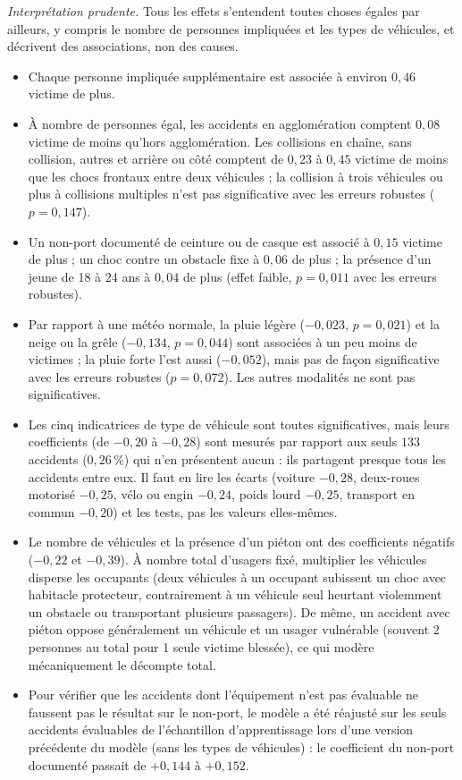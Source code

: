 \documentclass[11pt,a4paper]{article}
\begin{document}
\noindent\textit{Interprétation prudente.} Tous les effets s'entendent \og toutes choses égales par ailleurs\fg{}, y compris le nombre de personnes impliquées et les types de véhicules, et décrivent des associations, non des causes.
\begin{itemize}
    \item Chaque personne impliquée supplémentaire est associée à environ $0{,}46$ victime de plus.
    \item À nombre de personnes égal, les accidents en agglomération comptent $0{,}08$ victime de moins qu'hors agglomération. Les collisions en chaîne, sans collision, autres et arrière ou côté comptent de $0{,}23$ à $0{,}45$ victime de moins que les chocs frontaux entre deux véhicules ; la collision à trois véhicules ou plus à collisions multiples n'est pas significative avec les erreurs robustes ($p = 0{,}147$).
    \item Un non-port documenté de ceinture ou de casque est associé à $0{,}15$ victime de plus ; un choc contre un obstacle fixe à $0{,}06$ de plus ; la présence d'un jeune de 18 à 24 ans à $0{,}04$ de plus (effet faible, $p = 0{,}011$ avec les erreurs robustes).
    \item Par rapport à une météo normale, la pluie légère ($-0{,}023$, $p = 0{,}021$) et la neige ou la grêle ($-0{,}134$, $p = 0{,}044$) sont associées à un peu moins de victimes ; la pluie forte l'est aussi ($-0{,}052$), mais pas de façon significative avec les erreurs robustes ($p = 0{,}072$). Les autres modalités ne sont pas significatives.
    \item Les cinq indicatrices de type de véhicule sont toutes significatives, mais leurs coefficients (de $-0{,}20$ à $-0{,}28$) sont mesurés par rapport aux seuls $133$ accidents ($0{,}26\,\%$) qui n'en présentent aucun : ils partagent presque tous les accidents entre eux. Il faut en lire les écarts (voiture $-0{,}28$, deux-roues motorisé $-0{,}25$, vélo ou engin $-0{,}24$, poids lourd $-0{,}25$, transport en commun $-0{,}20$) et les tests, pas les valeurs elles-mêmes.
    \item Le nombre de véhicules et la présence d'un piéton ont des coefficients négatifs ($-0{,}22$ et $-0{,}39$). À nombre total d'usagers fixé, multiplier les véhicules disperse les occupants (deux véhicules à un occupant subissent un choc avec habitacle protecteur, contrairement à un véhicule seul heurtant violemment un obstacle ou transportant plusieurs passagers). De même, un accident avec piéton oppose généralement un véhicule et un usager vulnérable (souvent 2 personnes au total pour 1 seule victime blessée), ce qui modère mécaniquement le décompte total.
    \item Pour vérifier que les accidents dont l'équipement n'est pas évaluable ne faussent pas le résultat sur le non-port, le modèle a été réajusté sur les seuls accidents évaluables de l'échantillon d'apprentissage lors d'une version précédente du modèle (sans les types de véhicules) : le coefficient du non-port documenté passait de $+0{,}144$ à $+0{,}152$.
\end{itemize}
\end{document}
